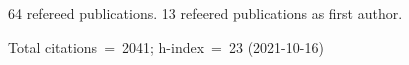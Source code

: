 64 refereed publications. 13 refeered publications as first author.

Total citations~=~2041; h-index~=~23 (2021-10-16)